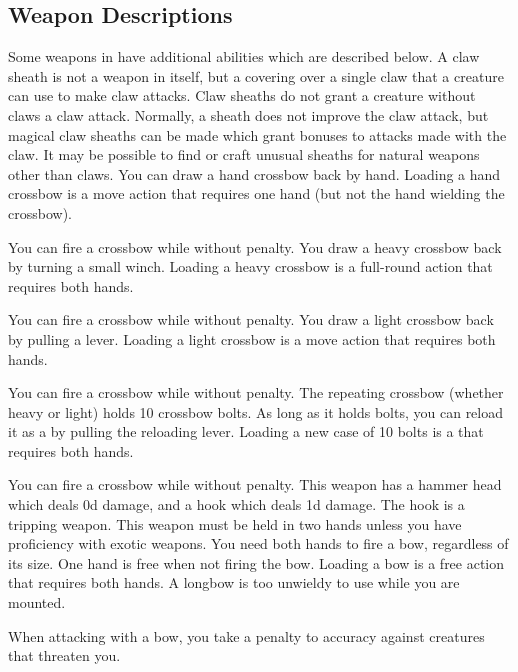     \subsection{Weapon Descriptions}
        Some weapons in  have additional abilities which are described below.
         A claw sheath is not a weapon in itself, but a covering over a single claw that a creature can use to make claw attacks. Claw sheaths do not grant a creature without claws a claw attack. Normally, a sheath does not improve the claw attack, but magical claw sheaths can be made which grant bonuses to attacks made with the claw. It may be possible to find or craft unusual sheaths for natural weapons other than claws.
         You can draw a hand crossbow back by hand. Loading a hand crossbow is a move action that requires one hand (but not the hand wielding the crossbow).
        \par You can fire a crossbow while \prone without penalty.
         You draw a heavy crossbow back by turning a small winch. Loading a heavy crossbow is a full-round action that requires both hands.
        \par You can fire a crossbow while \prone without penalty.
         You draw a light crossbow back by pulling a lever. Loading a light crossbow is a move action that requires both hands.
        \par You can fire a crossbow while \prone without penalty.
         The repeating crossbow (whether heavy or light) holds 10 crossbow bolts. As long as it holds bolts, you can reload it as a  by pulling the reloading lever. Loading a new case of 10 bolts is a  that requires both hands.
        \par You can fire a crossbow while \prone without penalty.
         This weapon has a hammer head which deals \plus0d damage, and a hook which deals \minus1d damage. The hook is a tripping weapon.
         This weapon must be held in two hands unless you have proficiency with exotic weapons.
         You need both hands to fire a bow, regardless of its size. One hand is free when not firing the bow. Loading a bow is a free action that requires both hands. A longbow is too unwieldy to use while you are mounted.
        \par When attacking with a bow, you take a  penalty to accuracy against creatures that threaten you.
